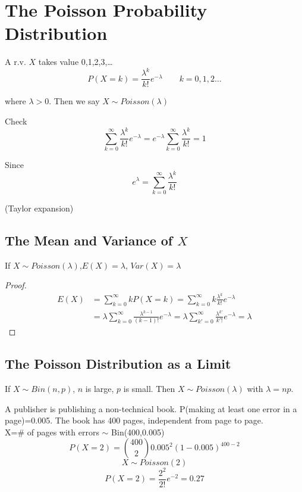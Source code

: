 \section{The Poisson Probability Distribution}
\begin{defn}
A r.v. $X$ takes value 0,1,2,3,\dots
 \[P(X=k)=\frac{\lambda^k}{k!} e^{-\lambda} \qquad k=0,1,2\dots\]

where $\lambda >0$. Then we say $X \sim Poisson(\lambda)$
\end{defn}

Check
 \[\sum_{k=0}^{\infty} \frac{\lambda^k}{k!} e^{-\lambda}=e^{-\lambda} \sum_{k=0}^{\infty} \frac{\lambda^k}{k!} =1 \]

Since 
\[e^{\lambda}=\sum_{k=0}^{\infty} \frac{\lambda^k}{k!}  \]

(Taylor expansion)
\subsection{The Mean and Variance of $X$}
\begin{prop}
If $X \sim Poisson(\lambda)$,$E(X)=\lambda$, $Var(X)=\lambda$
\begin{proof}
\begin{align*}
E(X)&=\sum _{k=0}^{\infty}kP(X=k)=\sum _{k=0}^{\infty}  k \frac{\lambda^k}{k!} e^{-\lambda} \\
&=\lambda \sum _{k=0}^{\infty} \frac{\lambda^{k-1}}{(k-1)!} e^{-\lambda}=\lambda \sum _{k'=0}^{\infty} \frac{\lambda^{k'}}{k'!} e^{-\lambda}=\lambda
\end{align*}
\end{proof}
\end{prop}

\subsection{The Poisson Distribution as a Limit}
\begin{prop}
If $X \sim Bin(n,p)$, $n$ is large, $p$ is small. Then $X \sim Poisson(\lambda)$ with $\lambda=np$.
\end{prop}

\begin{exmp}
A publisher is publishing a non-technical book. P(making at least one error in a page)=0.005. The book has 400 pages, independent from page to page.\\
X=\# of pages with errors $\sim$ Bin(400,0.005)
\[P(X=2)=\binom {400}{2} 0.005^2 (1-0.005)^{400-2}\]
\[X \sim Poisson(2)\]
\[P(X=2)=\frac{2^2}{2!}e^{-2}=0.27\]
\end{exmp}

